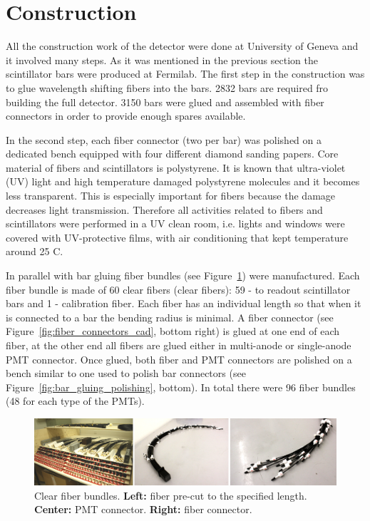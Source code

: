 \documentclass[a4paper,11pt]{article}
\begin{document}
\section{Construction}\label{sec:construction}

All the construction work of the detector were done at University of Geneva and it involved many steps. As it was mentioned in the previous section the
scintillator bars were produced at Fermilab. The first step in the construction was to glue wavelength shifting fibers into the bars. 2832 bars are required fro
building the full detector. 3150 bars were glued and assembled with fiber connectors in order to provide enough spares available.

In the second step, each fiber connector (two per bar) was polished on a dedicated bench equipped with four different diamond sanding papers. Core material of
fibers and scintillators is polystyrene. It is known that ultra-violet (UV) light and high temperature damaged polystyrene molecules and it becomes less transparent.
This is especially important for fibers because the damage decreases light transmission. Therefore all activities related to fibers and scintillators were performed
in a UV clean room, i.e. lights and windows were covered with UV-protective films, with air conditioning that kept temperature around 25 C.

In parallel with bar gluing fiber bundles (see Figure~\ref{fig:fiber_bundles}) were manufactured. Each fiber bundle is made of 60 clear fibers (clear fibers): 59 - to
readout scintillator bars and 1 - calibration fiber. Each fiber has an individual length so that when it is connected to a bar the bending radius is minimal. A fiber
connector (see Figure~\ref{fig:fiber_connectors_cad}, bottom right) is glued at one end of each fiber, at the other end all fibers are glued either in multi-anode or
single-anode PMT connector. Once glued, both fiber and PMT connectors are polished on a bench similar to one used to polish bar connectors (see
Figure~\ref{fig:bar_gluing_polishing}, bottom). In total there were 96 fiber bundles (48 for each type of the PMTs).

\begin{figure}[htp!]
 \centering
 \includegraphics[width=\textwidth]{./fiber_bundles}
 \caption[Clear fiber bundles]{Clear fiber bundles. {\bf Left:} fiber pre-cut to the specified length. {\bf Center:} PMT connector. {\bf Right:} fiber connector.}
 \label{fig:fiber_bundles}
\end{figure}


\end{document}
